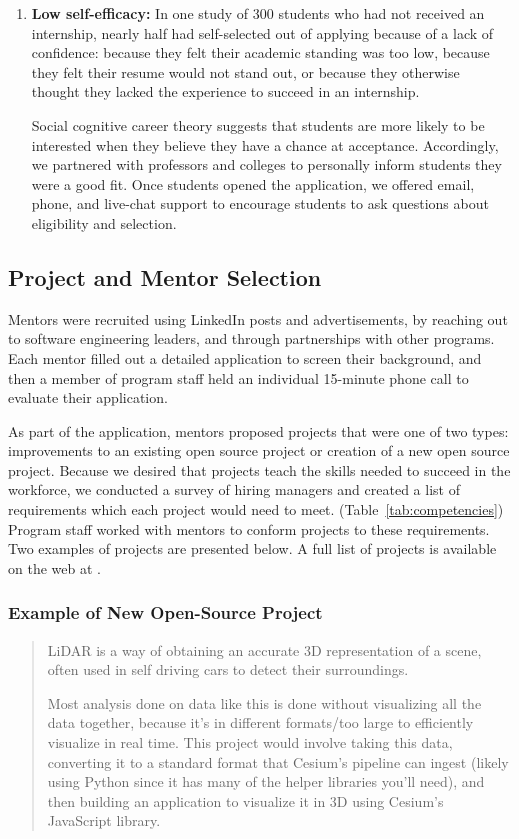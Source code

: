 \begin{enumerate}
    \item \textbf{Low self-efficacy:}
    In one study of 300 students who had not received an internship, nearly half had self-selected out of applying because of a lack of confidence: because they felt their academic standing was too low, because they felt their resume would not stand out, or because they otherwise thought they lacked the experience to succeed in an internship. \cite{kapoorBarriersSecuringIndustry2020}
    
    Social cognitive career theory suggests that students are more likely to be interested when they believe they have a chance at acceptance. \cite{lentUnifyingSocialCognitive1994} Accordingly, we partnered with professors and colleges to personally inform students they were a good fit. Once students opened the application, we offered email, phone, and live-chat support to encourage students to ask questions about eligibility and selection.
\end{enumerate}


\subsection{Project and Mentor Selection}

Mentors were recruited using LinkedIn posts and advertisements, by reaching out to software engineering leaders, and through partnerships with other programs. Each mentor filled out a detailed application to screen their background, and then a member of program staff held an individual 15-minute phone call to evaluate their application.

As part of the application, mentors proposed projects that were one of two types: improvements to an existing open source project or creation of a new open source project. Because we desired that projects teach the skills needed to succeed in the workforce, we conducted a survey of hiring managers and created a list of requirements which each project would need to meet. (Table~\ref{tab:competencies}) Program staff worked with mentors to conform projects to these requirements. Two examples of projects are presented below. A full list of projects is available on the web at \showcase.



\subsubsection{Example of New Open-Source Project}
\begin{quote}
LiDAR is a way of obtaining an accurate 3D representation of a scene, often used in self driving cars to detect their surroundings.

Most analysis done on data like this is done without visualizing all the data together, because it's in different formats/too large to efficiently visualize in real time. This project would involve taking this data, converting it to a standard format that Cesium's pipeline can ingest (likely using Python since it has many of the helper libraries you'll need), and then building an application to visualize it in 3D using Cesium's JavaScript library.
\end{quote}

